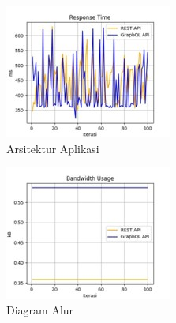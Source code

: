 \documentclass[
 manuscript=article,  %
  layout=publish, 
  year=2024, 
  month= Februari, %
  volume=8,
  number=1 
]{JIKO}
\begin{document}
\noindent
\begin{minipage}{0.48\textwidth}
    \begin{figure}[H]
        \centering
        \includegraphics[width=\textwidth]{assets/Picture9.jpg}
        \caption{Arsitektur Aplikasi}
        \label{fig:arsitektur}
    \end{figure}
\end{minipage}%
\hspace{0.04\textwidth}
\begin{minipage}{0.48\textwidth}
    \begin{figure}[H]
        \centering
        \includegraphics[width=\textwidth]{assets/Picture10.jpg}
        \caption{Diagram Alur}
        \label{fig:diagram}
    \end{figure}
\end{minipage}
\end{document}
